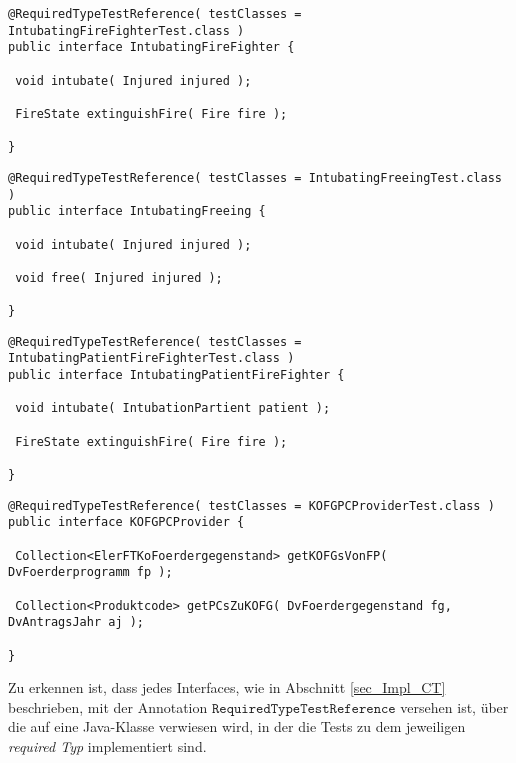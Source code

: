 \begin{lstlisting}[style = java, caption = Interface IntubatingFireFighter, captionpos = b, label = lst_interfaces_tei4]
@RequiredTypeTestReference( testClasses = IntubatingFireFighterTest.class )
public interface IntubatingFireFighter {

 void intubate( Injured injured );

 FireState extinguishFire( Fire fire );
  
}
\end{lstlisting}
\pagebreak
\begin{lstlisting}[style = java, caption = Interface IntubatingFreeing, captionpos = b, label = lst_interfaces_tei5]
@RequiredTypeTestReference( testClasses = IntubatingFreeingTest.class )
public interface IntubatingFreeing {

 void intubate( Injured injured );

 void free( Injured injured );
  
}
\end{lstlisting}
\begin{lstlisting}[style = java, caption = Interface IntubatingPatientFireFighter, captionpos = b, label = lst_interfaces_tei6]
@RequiredTypeTestReference( testClasses = IntubatingPatientFireFighterTest.class )
public interface IntubatingPatientFireFighter {

 void intubate( IntubationPartient patient );

 FireState extinguishFire( Fire fire );
  
}
\end{lstlisting}
\begin{lstlisting}[style = java, caption = Interface KOFGPCProvider, captionpos = b, label = lst_interfaces_tei7]
@RequiredTypeTestReference( testClasses = KOFGPCProviderTest.class )
public interface KOFGPCProvider {

 Collection<ElerFTKoFoerdergegenstand> getKOFGsVonFP( DvFoerderprogramm fp );
 
 Collection<Produktcode> getPCsZuKOFG( DvFoerdergegenstand fg, DvAntragsJahr aj ); 
  
}
\end{lstlisting}
Zu erkennen ist, dass jedes \Gls{Interface}s, wie in Abschnitt \ref{sec_Impl_CT} beschrieben, mit der Annotation $\texttt{RequiredTypeTestReference}$ versehen ist, über die auf eine Java-Klasse verwiesen wird, in der die Tests zu dem jeweiligen \emph{required Typ} implementiert sind.
\\\\
